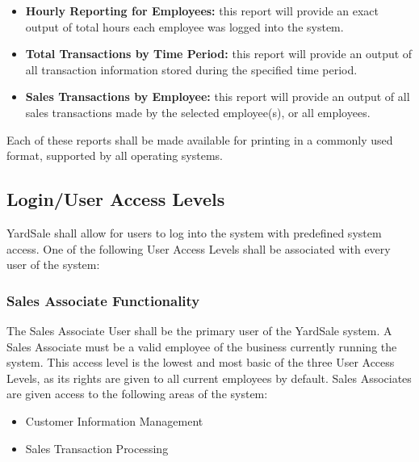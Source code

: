 \documentclass{report}
\begin{document}
            \begin{itemize}
                \item {\bf Hourly Reporting for Employees:} this
                report will provide an exact output of total hours
                each employee was logged into the system.
                \item {\bf Total Transactions by Time Period:} this report will
                provide an output of all transaction information
                stored during the specified time period.
                \item {\bf Sales Transactions by Employee:} this report
                will provide an output of all sales transactions
                made by the selected employee(s), or all
                employees.
            \end{itemize}

            \noindent Each of these reports shall be made
            available for printing in a commonly used format,
            supported by all operating systems.

        \subsection{Login/User Access Levels}
            YardSale shall allow for users to log into the system
            with predefined system access.  One of the following
            User Access Levels shall be associated with every user
            of the system:

            \subsubsection{Sales Associate Functionality}
                The Sales Associate User shall be the
                primary user of the YardSale system.  A Sales Associate
                must be a valid employee of the business currently
                running the system.  This access
                level is the lowest and most basic of the three
                User Access Levels, as its rights are given to all
                current employees by default.  Sales Associates
                are given access to the following areas of the
                system:

                \begin{itemize}
                    \item Customer Information Management
                    \item Sales Transaction Processing
                \end{itemize}
\end{document}

